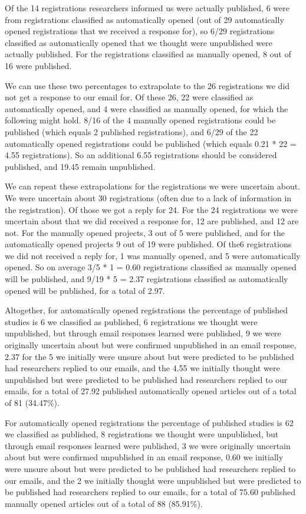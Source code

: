\documentclass[
  ,jou, a4paper,floatsintext]{apa6}
\begin{document}
Of the 14 registrations researchers informed us were actually published, 6 were from registrations classified as automatically opened (out of 29 automatically opened registrations that we received a response for), so 6/29 registrations classified as automatically opened that we thought were unpublished were actually published. For the registrations classified as manually opened, 8 out of 16 were published.

We can use these two percentages to extrapolate to the 26 registrations we did not get a response to our email for. Of these 26, 22 were classified as automatically opened, and 4 were classified as manually opened, for which the following might hold. 8/16 of the 4 manually opened registrations could be published (which equals 2 published registrations), and 6/29 of the 22 automatically opened registrations could be published (which equals 0.21 * 22 = 4.55 registrations). So an additional 6.55 registrations should be considered published, and 19.45 remain unpublished.

We can repeat these extrapolations for the registrations we were uncertain about. We were uncertain about 30 registrations (often due to a lack of information in the registration). Of those we got a reply for 24. For the 24 registrations we were uncertain about that we did received a response for, 12 are published, and 12 are not. For the manually opened projects, 3 out of 5 were published, and for the automatically opened projects 9 out of 19 were published. Of the6 registrations we did not received a reply for, 1 was manually opened, and 5 were automatically opened. So on average 3/5 * 1 = 0.60 registrations classified as manually opened will be published, and 9/19 * 5 = 2.37 registrations classified as automatically opened will be published, for a total of 2.97.

Altogether, for automatically opened registrations the percentage of published studies is 6 we classified as published, 6 registrations we thought were unpublished, but through email responses learned were published, 9 we were originally uncertain about but were confirmed unpublished in an email response, 2.37 for the 5 we initially were unsure about but were predicted to be published had researchers replied to our emails, and the 4.55 we initially thought were unpublished but were predicted to be published had researchers replied to our emails, for a total of 27.92 published automatically opened articles out of a total of 81 (34.47\%).

For automatically opened registrations the percentage of published studies is 62 we classified as published, 8 registrations we thought were unpublished, but through email responses learned were published, 3 we were originally uncertain about but were confirmed unpublished in an email response, 0.60 we initially were unsure about but were predicted to be published had researchers replied to our emails, and the 2 we initially thought were unpublished but were predicted to be published had researchers replied to our emails, for a total of 75.60 published manually opened articles out of a total of 88 (85.91\%).
\end{document}
